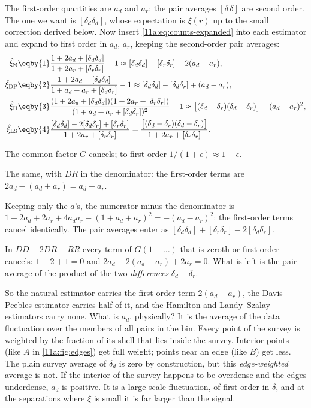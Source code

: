 The first-order quantities are $a_d$ and $a_r$; the pair averages
$[\delta\,\delta]$ are second order. The one we want is $[\delta_d\delta_d]$,
whose expectation is $\xi(r)$ up to the small correction derived below. Now
insert \eqref{11a:eq:counts-expanded} into each estimator and expand to first
order in $a_d$, $a_r$, keeping the second-order pair averages:
\begin{align}
  \hat\xi_{\mathrm N}
  &\eqby{1}\frac{1+2a_d+[\delta_d\delta_d]}{1+2a_r+[\delta_r\delta_r]}-1
   \approx [\delta_d\delta_d]-[\delta_r\delta_r]+2(a_d-a_r),\nonumber\\
  \hat\xi_{\mathrm{DP}}
  &\eqby{2}\frac{1+2a_d+[\delta_d\delta_d]}{1+a_d+a_r+[\delta_d\delta_r]}-1
   \approx [\delta_d\delta_d]-[\delta_d\delta_r]+(a_d-a_r),\nonumber\\
  \hat\xi_{\mathrm H}
  &\eqby{3}\frac{(1+2a_d+[\delta_d\delta_d])(1+2a_r+[\delta_r\delta_r])}
     {(1+a_d+a_r+[\delta_d\delta_r])^2}-1
   \approx \bigl[(\delta_d-\delta_r)(\delta_d-\delta_r)\bigr]-(a_d-a_r)^2,\nonumber\\
  \hat\xi_{\mathrm{LS}}
  &\eqby{4}\frac{[\delta_d\delta_d]-2[\delta_d\delta_r]+[\delta_r\delta_r]}
   {1+2a_r+[\delta_r\delta_r]}
   =\frac{\bigl[(\delta_d-\delta_r)(\delta_d-\delta_r)\bigr]}{1+2a_r+[\delta_r\delta_r]}.
  \label{11a:eq:estimators-expanded}
\end{align}
\begin{explain}
  \item The common factor $G$ cancels; to first order $1/(1+\epsilon)\approx1-\epsilon$.
  \item The same, with $DR$ in the denominator: the first-order terms are
        $2a_d-(a_d+a_r)=a_d-a_r$.
  \item Keeping only the $a$'s, the numerator minus the denominator is
        $1+2a_d+2a_r+4a_da_r-(1+a_d+a_r)^2=-(a_d-a_r)^2$: the first-order terms
        cancel identically. The pair averages enter as
        $[\delta_d\delta_d]+[\delta_r\delta_r]-2[\delta_d\delta_r]$.
  \item In $DD-2DR+RR$ every term of $G(1+\dots)$ that is zeroth or first order
        cancels: $1-2+1=0$ and $2a_d-2(a_d+a_r)+2a_r=0$. What is left is the pair
        average of the product of the two \emph{differences} $\delta_d-\delta_r$.
\end{explain}

So the natural estimator carries the first-order term $2(a_d-a_r)$, the
Davis--Peebles estimator carries half of it, and the Hamilton and Landy--Szalay
estimators carry none. What is $a_d$, physically? It is the average of the data
fluctuation over the members of all pairs in the bin. Every point of the survey
is weighted by the fraction of its shell that lies inside the survey. Interior
points (like $A$ in \cref{11a:fig:edges}) get full weight; points near an edge
(like $B$) get less. The plain survey average of $\delta_d$ is zero by
construction, but this \emph{edge-weighted} average is not. If the interior of
the survey happens to be overdense and the edges underdense, $a_d$ is positive.
It is a large-scale fluctuation, of first order in $\delta$, and at the
separations where $\xi$ is small it is far larger than the signal.

